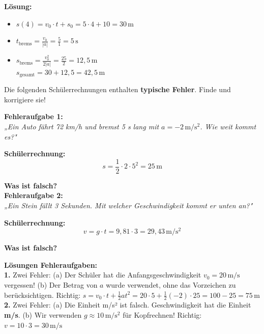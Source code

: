 \documentclass[11pt,a4paper]{article}
\begin{document}
\textbf{Lösung:}
\begin{itemize}
\item[a)] $s(4) = v_0 \cdot t + s_0 = 5 \cdot 4 + 10 = 30\,\mathrm{m}$
\item[b)] $t_{\text{brems}} = \frac{v_0}{|a|} = \frac{5}{1} = 5\,\mathrm{s}$
\item[c)] $s_{\text{brems}} = \frac{v_0^2}{2|a|} = \frac{25}{2} = 12{,}5\,\mathrm{m}$\\
$s_{\text{gesamt}} = 30 + 12{,}5 = 42{,}5\,\mathrm{m}$
\end{itemize}

\vspace{0.8cm}

\begin{tcolorbox}[colback=warnred!5, colframe=warnred, boxrule=1pt, title={\textbf{{$\bigstar\bigstar\bigstar$} Finde den Fehler! (AFB III)}}]
Die folgenden Schülerrechnungen enthalten \textbf{typische Fehler}. Finde und korrigiere sie!

\vspace{0.3cm}
\textbf{Fehleraufgabe 1:}\\
\textit{„Ein Auto fährt 72 km/h und bremst 5 s lang mit $a = -2\,\mathrm{m/s^2}$. Wie weit kommt es?"}

\textbf{Schülerrechnung:}
\[
s = \frac{1}{2} \cdot 2 \cdot 5^2 = 25\,\mathrm{m}
\]

\textbf{Was ist falsch?}\\[2.5cm]

\textbf{Fehleraufgabe 2:}\\
\textit{„Ein Stein fällt 3 Sekunden. Mit welcher Geschwindigkeit kommt er unten an?"}

\textbf{Schülerrechnung:}
\[
v = g \cdot t = 9{,}81 \cdot 3 = 29{,}43\,\mathrm{m/s^2}
\]

\textbf{Was ist falsch?}\\[2cm]
\end{tcolorbox}

\textbf{Lösungen Fehleraufgaben:}\\
\textbf{1.} Zwei Fehler: (a) Der Schüler hat die Anfangsgeschwindigkeit $v_0 = 20\,\mathrm{m/s}$ vergessen! (b) Der Betrag von $a$ wurde verwendet, ohne das Vorzeichen zu berücksichtigen. Richtig: $s = v_0 \cdot t + \frac{1}{2}at^2 = 20 \cdot 5 + \frac{1}{2}(-2) \cdot 25 = 100 - 25 = 75\,\mathrm{m}$\\
\textbf{2.} Zwei Fehler: (a) Die Einheit m/s² ist falsch. Geschwindigkeit hat die Einheit \textbf{m/s}. (b) Wir verwenden $g \approx 10\,\mathrm{m/s^2}$ für Kopfrechnen! Richtig: $v = 10 \cdot 3 = 30\,\mathrm{m/s}$
\end{document}
